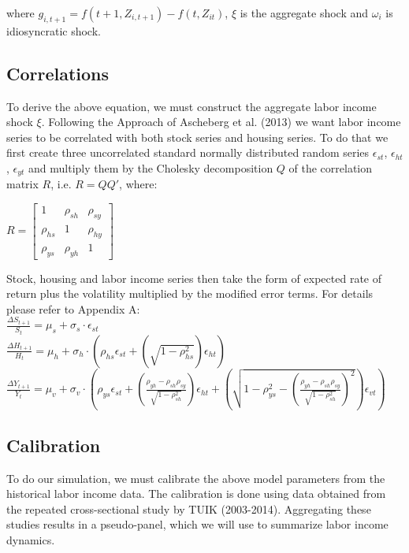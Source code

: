where $g_{i,t+1} = f(t+1, Z_{i,t+1}) - f(t, Z_{it})$, $\xi$ is the aggregate shock and $\omega_{i}$ is idiosyncratic shock.


\subsection{Correlations}

To derive the above equation, we must construct the aggregate labor income shock $\xi$. Following the Approach of Ascheberg et al. (2013) we want labor income series to be correlated with both stock series and housing series. To do that we first create three uncorrelated standard normally distributed random series $\epsilon_{st}$, $\epsilon_{ht}$, $\epsilon_{yt}$ and multiply them by the Cholesky decomposition $Q$ of the correlation matrix $R$, i.e. $R = QQ'$, where:

\begin{center}
	$R = \begin{bmatrix}
					1 & \rho_{sh} & \rho_{sy} \\
					\rho_{hs} & 1 & \rho_{hy} \\
					\rho_{ys} & \rho_{yh} & 1
			\end{bmatrix}
	$
\end{center}

Stock, housing and labor income series then take the form of expected rate of return plus the volatility multiplied by the modified error terms. For details please refer to Appendix A:\\
$\frac{\Delta S_{t+1}}{S_t} = \mu_s + \sigma_s \cdot \epsilon_{st}$\\
$\frac{\Delta H_{t+1}}{H_t} = \mu_h + \sigma_h \cdot \left(\rho_{hs}\epsilon_{st} + (\sqrt{1-\rho^2_{hs}})\epsilon_{ht}\right)$\\
$\frac{\Delta Y_{t+1}}{Y_t} = \mu_v + \sigma_v \cdot \left(\rho_{ys}\epsilon_{st} + \left(\frac{\rho_{yh} - \rho_{sh}\rho_{sy}}{\sqrt{1-\rho^2_{sh}}}\right)\epsilon_{ht} + \left(\sqrt{1-\rho^2_{ys}-(\frac{\rho_{yh} - \rho_{sh}\rho_{sy}}{\sqrt{1-\rho^2_{sh}}})^2}\right)\epsilon_{vt}\right)$


\subsection{Calibration}

To do our simulation, we must calibrate the above model parameters from the historical labor income data. The calibration is done using data obtained from the repeated cross-sectional study by TUIK (2003-2014). Aggregating these studies results in a pseudo-panel, which we will use to summarize labor income dynamics.

